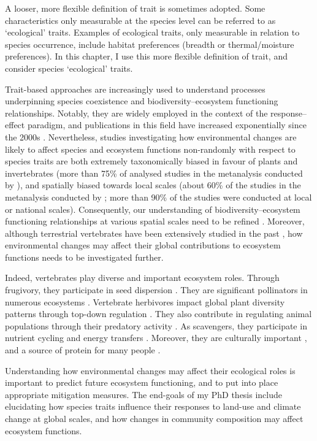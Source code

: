 A looser, more flexible definition of trait is sometimes adopted. Some characteristics only measurable at the species level can be referred to as `ecological' traits. Examples of ecological traits, only measurable in relation to species occurrence, include habitat preferences (breadth or thermal/moisture preferences). In this chapter, I use this more flexible definition of trait, and consider species `ecological' traits.

Trait-based approaches are increasingly used to understand processes underpinning species coexistence and biodiversity--ecosystem functioning relationships. Notably, they are widely employed in the context of the response--effect paradigm, and publications in this field have increased exponentially since the 2000s \citep{Hevia2017}. Nevertheless, studies investigating how environmental changes are likely to affect species and ecosystem functions non-randomly with respect to species traits are both extremely taxonomically biased in favour of plants and invertebrates (more than 75\% of analysed studies in the metanalysis conducted by \citet{Hevia2017}), and spatially biased towards local scales (about 60\% of the studies in the metanalysis conducted by \citet{Hevia2017}; more than 90\% of the studies were conducted at local or national scales). Consequently, our understanding of biodiversity--ecosystem functioning relationships at various spatial scales need to be refined \citep{Thompson2018, Isbell2018}. Moreover, although terrestrial vertebrates have been extensively studied in the past \citep{Titley2017}, how environmental changes may affect their global contributions to ecosystem functions needs to be investigated further. 

Indeed, vertebrates play diverse and important ecosystem roles. Through frugivory, they  participate in seed dispersion \citep{Wandrag2015, Mokany2014, McConkey2012}. They are significant pollinators in numerous ecosystems \citep{Ratto2018}. Vertebrate herbivores impact global plant diversity patterns through top-down regulation \citep{Lin2018, Zhang2018}. They also contribute in regulating animal populations through their predatory activity \citep{Paine2016, Luck2012, Letnic2012, Salo2010, Barber2010}. As scavengers, they participate in nutrient cycling and energy transfers \citep{Cunningham2018, Inger2016, Wilson2011}. Moreover, they are culturally important \citep{Hirons2016, Albert2018}, and a source of protein for many people \citep{Alves2018}.

Understanding how environmental changes may affect their ecological roles is important to predict future ecosystem functioning, and to put into place appropriate mitigation measures. The end-goals of my PhD thesis include elucidating how species traits influence their responses to land-use and climate change at global scales, and how changes in community composition may affect ecosystem functions.

